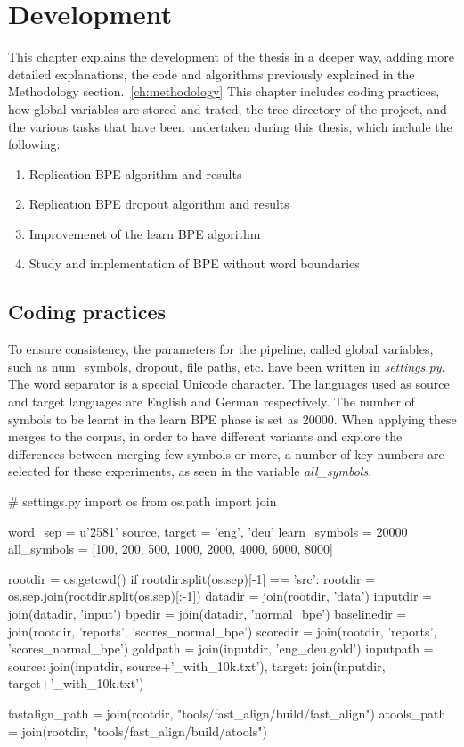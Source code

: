 %
%

\chapter{Development}\label{ch:development}

This chapter explains the development of the thesis in a deeper way, adding more detailed explanations, the code and algorithms previously explained in the Methodology section.~\ref{ch:methodology} This chapter includes coding practices, how global variables are stored and trated, the tree directory of the project, and the various tasks that have been undertaken during this thesis, which include the following:

\begin{enumerate}
  \item Replication BPE algorithm and results
  \item Replication BPE dropout algorithm and results
  \item Improvemenet of the learn BPE algorithm
  \item Study and implementation of BPE without word boundaries
\end{enumerate}

\section{Coding practices}

To ensure consistency, the parameters for the pipeline, called global variables, such as num\_symbols, dropout, file paths, etc. have been written in \emph{settings.py}. The word separator is a special Unicode character. The languages used as source and target languages are English and German respectively. The number of symbols to be learnt in the learn BPE phase is set as 20000. When applying these merges to the corpus, in order to have different variants and explore the differences between merging few symbols or more, a number of key numbers are selected for these experiments, as seen in the variable \emph{all\_symbols}.

\begin{python}
# settings.py
import os
from os.path import join

word_sep = u'\u2581'
source, target = 'eng', 'deu'
learn_symbols = 20000
all_symbols = [100, 200, 500, 1000, 2000, 4000, 6000, 8000]

rootdir = os.getcwd()
if rootdir.split(os.sep)[-1] == 'src':
    rootdir = os.sep.join(rootdir.split(os.sep)[:-1])
datadir = join(rootdir, 'data')
inputdir = join(datadir, 'input')
bpedir = join(datadir, 'normal_bpe')
baselinedir = join(rootdir, 'reports', 'scores_normal_bpe')
scoredir = join(rootdir, 'reports', 'scores_normal_bpe')
goldpath = join(inputdir, 'eng_deu.gold')
inputpath = {source: join(inputdir, source+'_with_10k.txt'),
            target: join(inputdir, target+'_with_10k.txt')}

fastalign_path = join(rootdir, "tools/fast_align/build/fast_align")
atools_path = join(rootdir, "tools/fast_align/build/atools")
\end{python}

